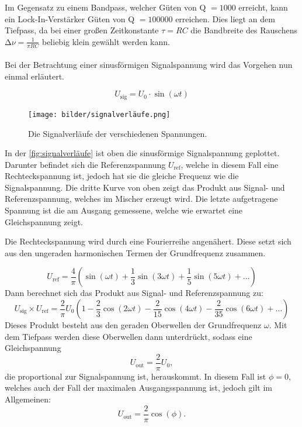     \noindent Im Gegensatz zu einem Bandpass, welcher Güten von Q $= \num{1000}$ erreicht, kann ein Lock-In-Verstärker Güten von Q $= \num{100000}$ erreichen. Dies liegt an dem 
    Tiefpass, da bei einer großen Zeitkonstante $ \tau = RC$ die Bandbreite des Rauschens $\increment \nu = \frac{1}{\pi RC}$ beliebig klein gewählt werden kann.
    \\
    \\

    \noindent Bei der Betrachtung einer sinusförmigen Signalspannung wird das Vorgehen nun einmal erläutert. 

    \begin{equation*}
        U_{\text{sig}} = U_0 \cdot \sin(\omega t)
    \end{equation*}

    \begin{figure}
        \centering
        \texttt{[image: bilder/signalverläufe.png]}
        \caption{Die Signalverläufe der verschiedenen Spannungen.\cite{anleitung}}
        \label{fig:signalverläufe}
    \end{figure}

    \noindent In der \autoref{fig:signalverläufe} ist oben die sinusförmige Signalspannung geplottet. Darunter befindet sich die Referenzspannung $U_{\text{ref}}$, welche in diesem 
    Fall eine Rechteckspannung ist, jedoch hat sie die gleiche Frequenz wie die Signalspannung. Die dritte Kurve von oben zeigt das Produkt aus Signal- und Referenzspannung, welches
    im Mischer erzeugt wird. Die letzte aufgetragene Spannung ist die am Ausgang gemessene, welche wie erwartet eine Gleichspannung zeigt. 

    \noindent Die Rechteckspannung wird durch eine Fourierreihe angenähert. Diese setzt sich aus den ungeraden harmonischen Termen der Grundfrequenz zusammen.

    \begin{equation*}
        U_{\text{ref}} = \frac{4}{\pi} \left( \sin(\omega t) + \frac{1}{3} \sin(3 \omega t ) +  \frac{1}{5} \sin(5 \omega t) + \dots \right) 
    \end{equation*}
    Dann berechnet sich das Produkt aus Signal- und Referenzspannung zu:
    \begin{equation*}
        U_{\text{sig}} \times U_{\text{ref}} = \frac{2}{\pi} U_0 \left(1 - \frac{2}{3} \cos(2 \omega t) - \frac{2}{15} \cos(4 \omega t) - \frac{2}{35} \cos(6 \omega t) + \dots \right) 
    \end{equation*}
    Dieses Produkt besteht aus den geraden Oberwellen der Grundfrequenz $\omega$. Mit dem Tiefpass werden diese Oberwellen dann unterdrückt, sodass eine Gleichspannung
    \begin{equation}
        \label{eqn:U_out}
        U_{\text{out}} = \frac{2}{\pi} U_0, 
    \end{equation}
    die proportional zur Signalspannung ist, herauskommt. In diesem Fall ist $\phi = 0$, welches auch der Fall der maximalen Ausgangsspannung ist, jedoch gilt im Allgemeinen:
    \begin{equation}
        \label{eqn:Kosinus}
        U_{\text{out}} = \frac{2}{\pi} \cos(\phi).
    \end{equation}